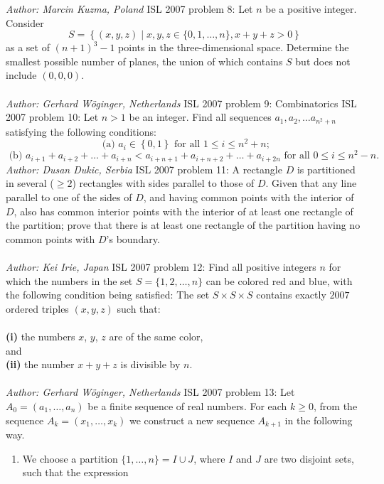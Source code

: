 \textit{Author: Marcin Kuzma, Poland} 
ISL 2007 problem 8:  Let $ n$ be a positive integer. Consider
\[ S = \left\{ (x,y,z) \mid x,y,z \in \{ 0, 1, \ldots, n\}, x + y + z > 0 \right \} \]
as a set of $ (n + 1)^3 - 1$ points in the three-dimensional space. Determine the smallest possible number of planes, the union of which contains $ S$ but does not include $ (0,0,0)$. \\\\
\textit{Author: Gerhard Wöginger, Netherlands } 
ISL 2007 problem 9:  Combinatorics 
ISL 2007 problem 10:  Let $ n > 1$ be an integer. Find all sequences $ a_1, a_2, \ldots a_{n^2 + n}$ satisfying the following conditions:
\[ \text{ (a) } a_i \in \left\{0,1\right\} \text{ for all } 1 \leq i \leq n^2 + n; \]
\[
\text{ (b) } a_{i + 1} + a_{i + 2} + \ldots + a_{i + n} < a_{i + n + 1} + a_{i + n + 2} + \ldots + a_{i + 2n} \text{ for all } 0 \leq i \leq n^2 - n.
\]
\textit{Author: Dusan Dukic, Serbia} 
ISL 2007 problem 11:  A rectangle $ D$ is partitioned in several ($ \ge2$) rectangles with sides parallel to those of $ D$. Given that any line parallel to one of the sides of $ D$, and having common points with the interior of $ D$, also has common interior points with the interior of at least one rectangle of the partition; prove that there is at least one rectangle of the partition having no common points with $ D$'s boundary. \\\\
\textit{Author: Kei Irie, Japan} 
ISL 2007 problem 12:  Find all positive integers $ n$ for which the numbers in the set $ S = \{1,2, \ldots,n \}$ can be colored red and blue, with the following condition being satisfied: The set $ S \times S \times S$ contains exactly $ 2007$ ordered triples $ \left(x, y, z\right)$ such that: \\\\
\textbf{(i)} the numbers $ x$, $ y$, $ z$ are of the same color, \\
and \\
\textbf{(ii)} the number $ x + y + z$ is divisible by $ n$. \\\\
\textit{Author: Gerhard Wöginger, Netherlands} 
ISL 2007 problem 13:  Let $ A_0 = (a_1,\dots,a_n)$ be a finite sequence of real numbers. For each $ k\geq 0$, from the sequence $ A_k = (x_1,\dots,x_k)$ we construct a new sequence $ A_{k + 1}$ in the following way.
\begin{enumerate}
  \item We choose a partition $ \{1,\dots,n\} = I\cup J$, where $ I$ and $ J$ are two disjoint sets, such that the expression
\end{enumerate}
